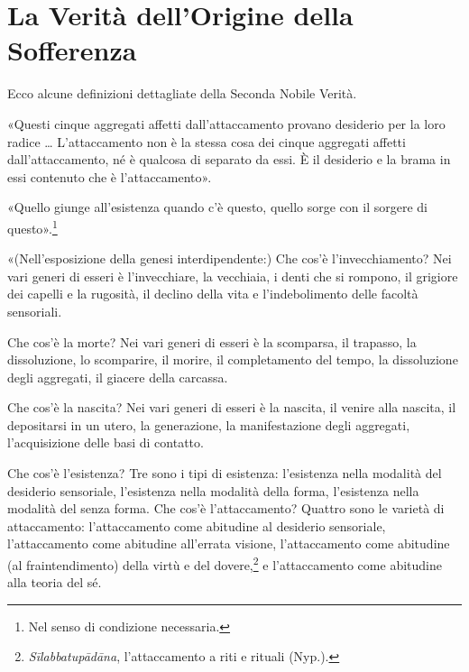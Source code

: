 
\section*{La Verità dell’Origine della Sofferenza}

 Ecco alcune definizioni dettagliate della Seconda
Nobile Verità.

 «Questi cinque aggregati affetti dall’attaccamento provano
desiderio per la loro radice … L’attaccamento non è la stessa cosa dei cinque
aggregati affetti dall’attaccamento, né è qualcosa di separato da essi. È il
desiderio e la brama in essi contenuto che è l’attaccamento».


«Quello giunge all’esistenza quando c’è questo, quello sorge con il sorgere di
questo».\footnote{Nel senso di condizione necessaria.}


«(Nell’esposizione della genesi interdipendente:)
Che cos’è l’invecchiamento? Nei vari generi di esseri è l’invecchiare, la
vecchiaia, i denti che si rompono, il grigiore dei capelli e la rugosità, il
declino della vita e l’indebolimento delle facoltà sensoriali.

Che cos’è la morte? Nei vari generi di esseri è la scomparsa, il trapasso, la
dissoluzione, lo scomparire, il morire, il completamento del tempo, la
dissoluzione degli aggregati, il giacere della carcassa.

Che cos’è la nascita? Nei vari generi di esseri è la nascita, il venire alla
nascita, il depositarsi in un utero, la generazione, la manifestazione degli
aggregati, l’acquisizione delle basi di contatto.

Che cos’è l’esistenza? Tre sono i tipi di esistenza: l’esistenza nella modalità
del desiderio sensoriale, l’esistenza nella modalità della forma, l’esistenza
nella modalità del senza forma. Che cos’è l’attaccamento? Quattro sono le
varietà di attaccamento: l’attaccamento come abitudine al desiderio sensoriale,
l’attaccamento come abitudine all’errata visione, l’attaccamento come abitudine
(al fraintendimento) della virtù e del dovere,\footnote{\emph{Sīlabbatupādāna},
  l’attaccamento a riti e rituali (Nyp.).} e l’attaccamento come abitudine alla
teoria del sé.

